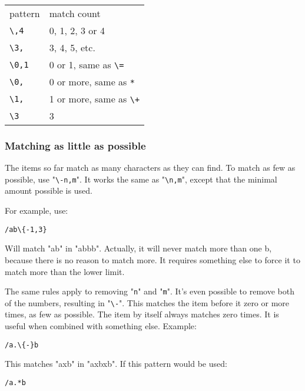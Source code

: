 \begin{center} \begin{tabular}{l l}
				pattern & match count \\
				\texttt{\textbackslash{}{,4}} & 0, 1, 2, 3 or 4 \\
				\texttt{\textbackslash{}{3,}} & 3, 4, 5, etc. \\
				\texttt{\textbackslash{}{0,1}} & 0 or 1, same as \texttt{\textbackslash{}=} \\
				\texttt{\textbackslash{}{0,}} & 0 or more, same as \texttt{*} \\
				\texttt{\textbackslash{}{1,}} & 1 or more, same as \texttt{\textbackslash{}+} \\
				\texttt{\textbackslash{}{3}} & 3 \\
\end{tabular} \end{center}
\subsubsection{Matching as little as possible}
The items so far match as many characters as they can find.
To match as few as possible, use "\texttt{\textbackslash{}{-n,m}}".
It works the same as "\texttt{\textbackslash{}{n,m}}", except that the minimal amount possible is used.

For example, use:

\begin{Verbatim}[samepage=true]
 /ab\{-1,3}
\end{Verbatim}

Will match "ab" in "abbb".
Actually, it will never match more than one b, because there is no reason to match more.
It requires something else to force it to match more than the lower limit.

The same rules apply to removing "\texttt{n}" and "\texttt{m}".
It's even possible to remove both of the numbers, resulting in "\texttt{\textbackslash{}{-}}".
This matches the item before it zero or more times, as few as possible.
The item by itself always matches zero times.
It is useful when combined with something else.
Example:

\begin{Verbatim}[samepage=true]
 /a.\{-}b
\end{Verbatim}

This matches "axb" in "axbxb".
If this pattern would be used:

\begin{Verbatim}[samepage=true]
 /a.*b
\end{Verbatim}

